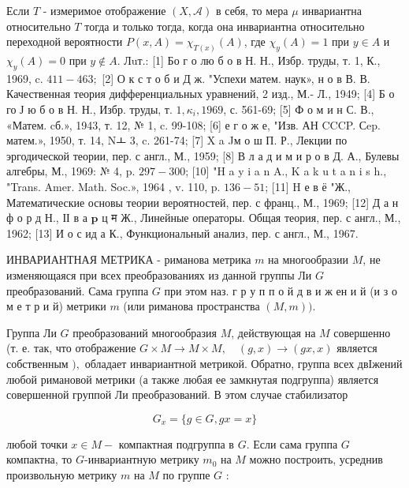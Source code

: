 \documentclass[10pt]{article}
\begin{document}
Если $T$ - измеримое отображение $(X, \mathcal{A})$ в себя, то мера $\mu$ инвариантна относительно $T$ тогда и только тогда, когда она инвариантна относительно переходной вероятности $P(x, A)=\chi_{T(x)}(A)$, где $\chi_{y}(A)=1$ при $y \in A$ и $\chi_{y}(A)=0$ при $y \notin A$. Лuт.: [1] Бо г о лю б о в Н. Н., Избр. труды, т. 1, К., 1969, c. $411-463 ;$ [2] О к с т о б и Д ж. "Успехи матем. наук», н о в В. В. Качественная теория дифференциальных уравнений, 2 изд., М.- Л., 1949; [4] Б о го Ј ю б о в Н. Н., Избр. труды, т. $1, \kappa_{i}, 1969$, с. 561-69; [5] Ф о м и н С. В., «Матем. cб.», 1943, т. 12, № 1, c. 99-108; [6] е г о ж е, "Изв. АН CCCP. Сep. матем.», 1950, т. 14, Nㅗ 3, c. 261-74; [7] X a Jм о ш П. Р., Лекции по эргодической теории, пер. с англ., М., 1959; [8] В л а д и м и р о в Д. А., Булевы алгебры, М., 1969: № 4, p. $297-300$; [10] "H a y i a n A., K a k u t a n i s h., "Trans. Amer. Math. Soc.», 1964 , v. 110, p. $136-51$; [11] H е в ё "Ж., Математические основы теории вероятностей, пер. с франц., М., 1969; [12] Д а н ф о р д Н., ІІ в а $\mathbf{p}$ ц म Ж., Линейные операторы. Общая теория, пер. с англ., М., 1962; [13] И о с ид а К., Функциональный анализ, пер. с англ., М., 1967.



ИНВАРИАНТНАЯ МЕТРИКА - риманова метрика $m$ на многообразии $M$, не изменяющаяся при всех преобразованиях из данной группы Ли $G$ преобразований. Сама группа $G$ при этом наз. г р у п п о й д в и ж ен и й (и з о м е т р и й) метрики $m$ (или риманова пространства $(M, m))$.



Группа Ли $G$ преобразований многообразия $M$, действующая на $M$ совершенно (т. е. так, что отображение $G \times M \rightarrow M \times M, \quad(g, x) \rightarrow(g x, x)$ является собственным $),$ обладает инвариантной метрикой. Обратно, группа всех двІжений любой римановой метрики (а также любая ее замкнутая подгруппа) является совершенной группой Ли преобразований. В этом случае стабилизатор



\[

G_{x}=\{g \in G, g x=x\}

\]



любой точки $x \in M-$ компактная подгруппа в $G$. Если сама группа $G$ компактна, то $G$-инвариантную метрику $m_{0}$ на $M$ можно построить, усреднив произвольную метрику $m$ на $M$ по группе $G$ :
\end{document}
